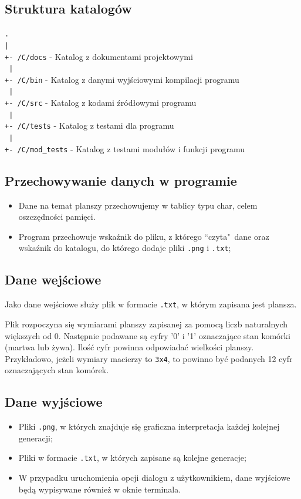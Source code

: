 \documentclass[a4paper,12pt]{article}
\begin{document}
\subsection{Struktura katalogów}
\noindent\texttt{.\\
|\\
+- /C/docs} - Katalog z dokumentami projektowymi\\\texttt{
|\\
+- /C/bin} - Katalog z danymi wyjściowymi kompilacji programu\\\texttt{
|\\
+- /C/src} - Katalog z kodami źródłowymi programu\\\texttt{
|\\
+- /C/tests} - Katalog z testami dla programu\\\texttt{
|\\
+- /C/mod\_tests} - Katalog z testami modułów i funkcji programu


\subsection{Przechowywanie danych w programie}
\begin{itemize}
\item Dane na temat planszy przechowujemy w tablicy typu char, celem oszczędności pamięci. 
\item Program przechowuje wskaźnik do pliku, z którego ``czyta"\ dane oraz wskaźnik do katalogu, do którego dodaje pliki \texttt{.png} i \texttt{.txt};
\end{itemize}

\subsection{Dane wejściowe}
Jako dane wejściowe służy plik w formacie \texttt{.txt}, w którym zapisana jest plansza.

Plik rozpoczyna się wymiarami planszy zapisanej za pomocą liczb naturalnych większych od 0. Następnie podawane są cyfry '0' i '1' oznaczające stan komórki (martwa lub żywa). Ilość cyfr powinna odpowiadać wielkości planszy. Przykładowo, jeżeli wymiary macierzy to \texttt{3x4}, to powinno być podanych 12 cyfr oznaczających stan komórek.


\subsection{Dane wyjściowe}
\begin{itemize}
\item Pliki \texttt{.png}, w których znajduje się graficzna interpretacja każdej kolejnej generacji;
\item Pliki w formacie \texttt{.txt}, w których zapisane są kolejne generacje;
\item W przypadku uruchomienia opcji dialogu z użytkownikiem, dane wyjściowe będą wypisywane również w oknie terminala.
\end{itemize}
\end{document}
